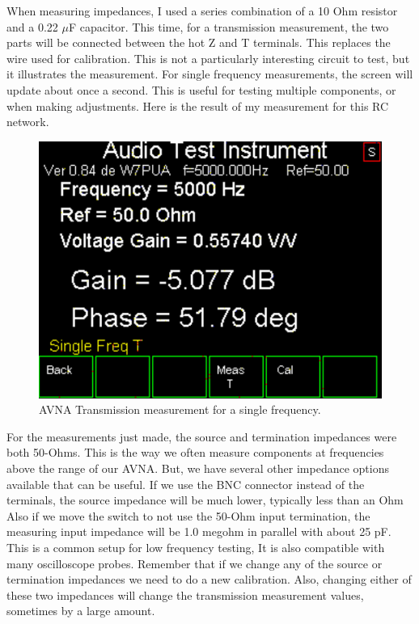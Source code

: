 %
When measuring impedances, I used a series combination of a 10 Ohm resistor and a 0.22 $\mu$F capacitor.  This time, for a transmission measurement, the two parts will be connected between the hot Z and T terminals. This replaces the wire used for calibration.  This is not a particularly interesting circuit to test, but it illustrates the measurement.  For single frequency measurements, the screen will update about once a second.  This is useful for testing multiple components, or when making adjustments.  Here is the result of my measurement for this RC network.
\begin{figure}[H]
\begin{center}
\includegraphics[scale=0.75]{./images/AVNA_047.pdf}
\caption{AVNA Transmission measurement for a single frequency.}
\label{AVNA_047-label}
\end{center}
\end{figure}
%
For the measurements  just made, the source and termination impedances were both 50-Ohms.  This is the way we often measure components at frequencies above the range of our AVNA.  But, we have several other impedance options available that can be useful.  If we use the BNC connector instead of the terminals, the source impedance will be much lower, typically less than an Ohm  Also if we move the switch to not use the 50-Ohm input termination, the measuring input impedance will be 1.0 megohm in parallel with about 25 pF.  This is a common setup for low frequency testing,  It is also compatible with many oscilloscope probes.  Remember that if we change any of the source or termination impedances we need to do a new calibration.  Also, changing either of these two impedances will change the transmission measurement values, sometimes by a large amount.

